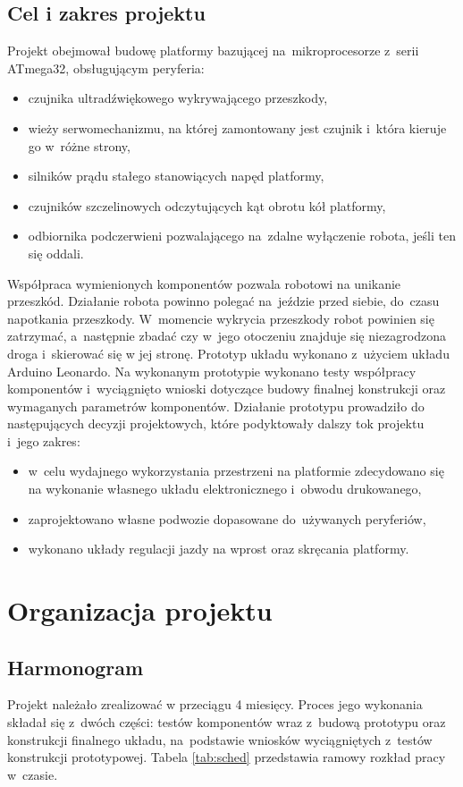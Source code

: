 \documentclass[11pt]{article}
\begin{document}
\subsection{Cel i zakres projektu}
Projekt obejmował budowę platformy bazującej na~mikroprocesorze z~serii ATmega32, obsługującym peryferia:
\begin{itemize}
	\item czujnika ultradźwiękowego wykrywającego przeszkody,
	\item wieży serwomechanizmu, na której zamontowany jest czujnik i~która kieruje go w~różne strony,
	\item silników prądu stałego stanowiących napęd platformy,
	\item czujników szczelinowych odczytujących kąt obrotu kół platformy,
	\item odbiornika podczerwieni pozwalającego na~zdalne wyłączenie robota, jeśli ten się oddali.
\end{itemize}
Współpraca wymienionych komponentów pozwala robotowi na unikanie przeszkód.
Działanie robota powinno polegać na~jeździe przed siebie, do~czasu napotkania przeszkody.
W~momencie wykrycia przeszkody robot powinien się zatrzymać, a~następnie zbadać czy w~jego otoczeniu znajduje się niezagrodzona droga i~skierować się w jej stronę.
Prototyp układu wykonano z~użyciem układu Arduino Leonardo.
Na wykonanym prototypie wykonano testy współpracy komponentów i~wyciągnięto wnioski dotyczące budowy finalnej konstrukcji oraz wymaganych parametrów komponentów.
Działanie prototypu prowadziło do następujących decyzji projektowych, które podyktowały dalszy tok projektu i~jego zakres:
\begin{itemize}
	\item w~celu wydajnego wykorzystania przestrzeni na platformie zdecydowano się na wykonanie własnego układu elektronicznego i~obwodu drukowanego,
	\item zaprojektowano własne podwozie dopasowane do~używanych peryferiów,
	\item wykonano układy regulacji jazdy na wprost oraz skręcania platformy.
\end{itemize}

\section{Organizacja projektu}
\subsection{Harmonogram}
Projekt należało zrealizować w przeciągu 4 miesięcy.
Proces jego wykonania składał się z~dwóch części: testów komponentów wraz z~budową prototypu oraz konstrukcji finalnego układu, na~podstawie wniosków wyciągniętych z~testów konstrukcji prototypowej.
	Tabela \ref{tab:sched} przedstawia ramowy rozkład pracy w~czasie.
\end{document}
